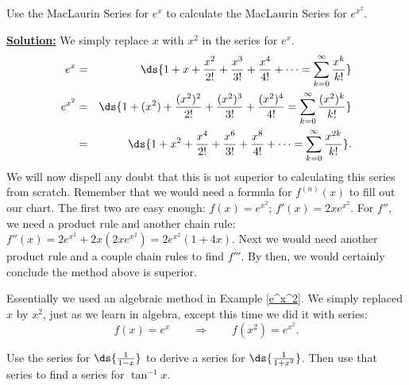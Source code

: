 \bex\label{e^x^2}Use the MacLaurin Series
for $e^x$ to calculate the MacLaurin Series for $e^{x^2}$.
\medskip

\underline{\bf Solution:} We simply replace $x$ with $x^2$
in the series for $e^x$.
\begin{eqnarray*}
e^x&=&\ds{1+x+\frac{x^2}{2!}+\frac{x^3}{3!}+\frac{x^4}{4!}+\cdots
=\sum_{k=0}^\infty\frac{x^k}{k!}}\\
e^{x^2}&=&\ds{1+(x^2)+\frac{(x^2)^2}{2!}+\frac{(x^2)^3}{3!}
+\frac{(x^2)^4}{4!}=\sum_{k=0}^\infty\frac{(x^2)^k}{k!}}\\
&=&\ds{1+x^2+\frac{x^4}{2!}+\frac{x^6}{3!}+\frac{x^8}{4!}+\cdots
=\sum_{k=0}^\infty\frac{x^{2k}}{k!}}.\end{eqnarray*}     
\eex
We will now dispell any doubt that this is not superior to 
calculating this series from scratch.  Remember that we would
need a formula for $f^{(n)}(x)$ to fill out our chart.
The first two are easy enough: $f(x)=e^{x^2}$; $f'(x)=2xe^{x^2}$.
For $f''$, we need a product rule and another chain rule:
$f''(x)=2e^{x^2}+2x(2xe^{x^2})=2e^{x^2}(1+4x)$.  Next we
would need another product rule and a couple chain rules to
find $f'''$.  By then, we would certainly conclude the method above
is superior.

Essentially we used an algebraic method in Example \ref{e^x^2}.
  We simply replaced $x$ by $x^2$, just as we learn in algebra, except
this time we did it with series:
$$f(x)=e^x \qquad\Longrightarrow\qquad f(x^2)=e^{x^2}.$$

\bex \label{ArctanxSeries}Use the series for
$\ds{\frac1{1-x}}$ to derive a series for $\ds{\frac1{1+x^2}}$.
Then use that series to find a series for $\tan^{-1}x$.
\medskip

